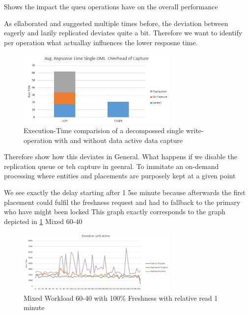 Shows the impact the queu operations have on the overall performance


As ellaborated and suggested multiple times before, the deviation between eagerly and lazily replicated deviates quite a bit.
Therefore we want to identify per operation what actuallay influences the lower resposne time.

\begin{figure}[t] 
    \centering 
    \includegraphics[width=0.7\textwidth]{Figures/dml_comp.PNG}
    \caption{Execution-Time comparision of a decompossed  single write-operation with and without data active data capture }
    \label{fig:write_decomposition}
\end{figure}


Therefore show how this deviates in General. What happens if we disable the replication queue or teh capture in geenral.
To immitate an on-demand processing where entities and placements are purposely kept at a given point

We see exactly the delay starting after 1 5se minute because afterwards the first placement could fulfil the freshness request and had to fallback to the primary who have might been locked
This graph exactly corresponds to the graph depicted in \ref{fig:write_decomposition} 
Mixed 60-40
\begin{figure}[t] 
    \centering 
    \includegraphics[width=0.7\textwidth]{Figures/deviation_with_active_que.PNG}
    \caption{Mixed Workload 60-40 with 100\% Freshness with relative read 1 minute }
    \label{fig:replication Impact}
\end{figure}








